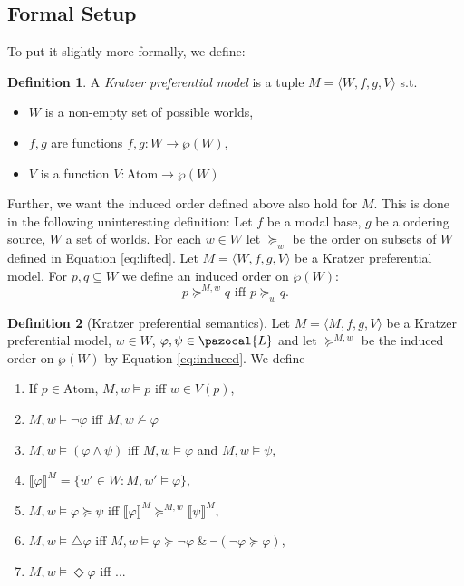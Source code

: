 \documentclass{article}
\theoremstyle{definition}
\newtheorem{definition}{Definition}
\renewcommand{\L}{\pazocal{L}}
\newcommand{\lb}{\llbracket}
\newcommand{\rb}{\rrbracket}
\begin{document}
\subsection{Formal Setup}

To put it slightly more formally, we define: 
\begin{definition}
    A \emph{Kratzer preferential model} is a tuple $M = \langle W,f,g,V \rangle$ s.t.
    \begin{itemize}[nosep]
\renewcommand\labelitemi{--}
      \item $W$ is a non-empty set of possible worlds,
      \item $f,g$ are functions $f,g: W \rightarrow \wp(W)$,
      \item $V$ is a function $V: \text{Atom} \rightarrow \wp(W)$
    \end{itemize}
\end{definition}

Further, we want the induced order defined above also hold for $M$.
This is done in the following uninteresting definition:
Let $f$ be a modal base, $g$ be a ordering source, $W$ a set of worlds.
For each $w \in W$ let $\succeq_w$ be the order on subsets of $W$ defined in
Equation \ref{eq:lifted}.
Let $M = \langle W,f,g,V \rangle$ be a Kratzer preferential model.
For $p,q \subseteq W$ we define an induced order on $\wp(W)$:   
\begin{equation}
    \label{eq:induced}
       p \succeq^{M,w} q \text{ iff } p \succeq_w q.
\end{equation}
    
\begin{definition}[Kratzer preferential semantics]
    \label{def:kratsem}
    Let $M = \langle M,f,g,V \rangle$ be a Kratzer preferential model, $w \in W$, $\varphi, \psi \in \L$ and let $\succeq^{M,w}$ be the induced order on $\wp(W)$ by Equation \ref{eq:induced}. We define 
    
    \begin{enumerate}[nosep]
      \item If $p \in \text{Atom}$, $M,w \models p$ iff $w \in V(p)$,
      \item $M,w \models \neg \varphi$ iff $M,w \not\models \varphi$
      \item $M,w \models (\varphi \land \psi)$ iff $M,w \models \varphi$ and $M,w \models \psi$,
      \item $\lb \varphi \rb^M = \{w' \in W : M,w' \models \varphi\}$,
      \item $M,w \models \varphi \succeq \psi$ iff $\lb \varphi \rb^M \succeq^{M,w} \lb \psi \rb^M$,
      \item $M,w \models \triangle \varphi$ iff $M,w \models \varphi \succeq \neg \varphi ~\&~ \neg (\neg \varphi \succeq \varphi)$,
      \item $M,w \models \Diamond \varphi$ iff ...
    \end{enumerate}
\end{definition}
\end{document}
